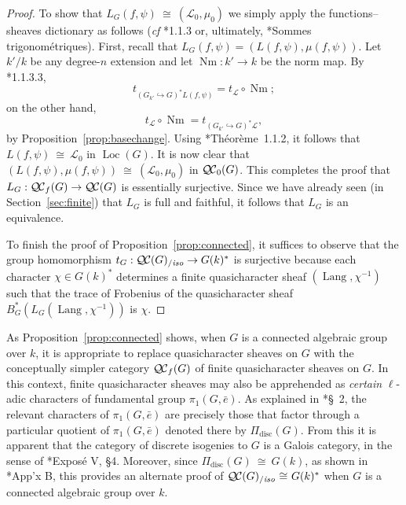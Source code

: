 \documentclass[11pt]{amsart}
\theoremstyle{plain}
\theoremstyle{definition}
\theoremstyle{remark}
\newcommand{\bFq}{\bar{k}}
\newcommand{\Fq}{k}
\DeclareMathOperator{\Gal}{Gal}
\DeclareMathOperator{\Nm}{Nm}
\newcommand{\iso}{{\ \cong\ }}
\newcommand{\qcs}[1]{{\mathcal{#1}}}
\newcommand{\QC}{{\mathcal{Q\hskip-0.8pt C}}}
\newcommand{\QCb}{{\QC_0}}
\newcommand{\QCf}{{\QC_f}}
\newcommand{\QCiso}[1]{\QC(#1)_{/\textit{iso}}}
\newcommand{\Lang}{{\operatorname{Lang}}}
\newcommand{\Loc}{{\operatorname{Loc}}}
\newcommand{\trFrob}[1]{t_{#1}}
\begin{document}
\begin{proof}
  To show that $L_G(f,\psi) \iso (\qcs{L}_0,\mu_0)$ we simply apply the functions--sheaves dictionary
  as follows ({\it cf} \cite{laumon:87a}*{1.1.3} or, ultimately, \cite{deligne:SGA4.5}*{Sommes trigonométriques}).
  First, recall that $L_G(f,\psi) = (L(f,\psi), \mu(f,\psi))$.
  Let $k'/k$ be any degree-$n$ extension and let $\Nm : k'\to k$ be the norm map. 
  By \cite{laumon:87a}*{1.1.3.3}, 
  \[
  \trFrob{(G_{k'}\hookrightarrow G)^*L(f,\psi)} = \trFrob{\qcs{L}} \circ \Nm;
  \]
  on the other hand, 
  \[
  \trFrob{\qcs{L}} \circ \Nm = \trFrob{(G_{k'}\hookrightarrow G)^*\qcs{L}},
  \]
   by Proposition~\ref{prop:basechange}.
  Using \cite{laumon:87a}*{Th\'eor\`eme~1.1.2}, it follows that  $L(f,\psi) \iso \qcs{L}_0$ in $\Loc(G)$.
  It is now clear that $(L(f,\psi),\mu(f,\psi)) \iso (\qcs{L}_0,\mu_0)$ in $\QCb(G)$.
  This completes the proof that $L_G : \QCf(G) \to \QC(G)$ is essentially surjective.
  Since we have already seen (in Section~\ref{sec:finite}) that $L_G$ is full and faithful, 
  it follows that $L_G$ is an equivalence.
  
  To finish the proof of Proposition~\ref{prop:connected}, it suffices to observe that the group homomorphism
  $
  \trFrob{G} : \QCiso{G} \to G(\Fq)^*
  $
  is surjective because each character $\chi \in G(\Fq)^*$ determines a finite quasicharacter
  sheaf $(\Lang,\chi^{-1})$ such that the trace of Frobenius of the quasicharacter sheaf
  $B_G^* (L_G(\Lang,\chi^{-1}))$ is $\chi$.
\end{proof}

As Proposition~\ref{prop:connected} shows, 
when $G$ is a connected algebraic group over $\Fq$, 
it is appropriate to replace quasicharacter sheaves on $G$ 
with the conceptually simpler category $\QCf(G)$ of finite quasicharacter sheaves on $G$. 
In this context, finite quasicharacter sheaves may also be apprehended as
\emph{certain} $\ell$-adic characters of fundamental group $\pi_1(G,{\bar e})$. 
As explained in \cite{kamgarpour:09a}*{\S~2}, 
the relevant characters of $\pi_1(G,{\bar e})$ are precisely those 
that factor through a particular quotient of $\pi_1(G,{\bar e})$ 
denoted there by $\Pi_\text{disc}(G)$.
From this it is apparent that the category of discrete isogenies to $G$ is a Galois category,
in the sense of \cite{grothendieck:SGA1}*{Expos\'e V, \S 4}. Moreover, since $\Pi_\text{disc}(G) \iso G(\Fq)$,
as shown in \cite{kamgarpour:09a}*{App'x B}, this provides an alternate proof of $\QCiso{G} \iso G(\Fq)^*$ when $G$ is a connected algebraic group over $\Fq$.
\end{document}

